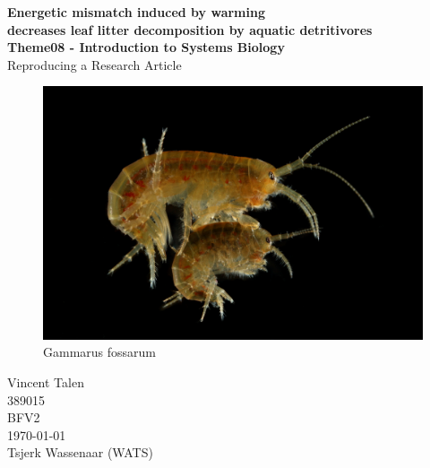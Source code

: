 


\begin{center}
  \topskip=45pt
  \LARGE{\textbf{Energetic mismatch induced by warming\\decreases leaf litter decomposition by aquatic detritivores}}\\
  \vspace*{20pt}
  \large{\textbf{Theme08 - Introduction to Systems Biology}}\\
  \large{Reproducing a Research Article}\\
  \vspace*{40pt}
  \begin{figure}
    \centering
    \includegraphics[width=130mm]{figures/gammarus_fossarum.jpeg}
    \caption{Gammarus fossarum}
    \label{fig:g.fossarum}
  \end{figure}
\end{center}
\vspace*{\fill}
\begin{flushright}
  Vincent Talen\\
  389015\\
  BFV2\\
  \today\\
  Tsjerk Wassenaar (WATS)\\
\end{flushright}


\newpage
\null


